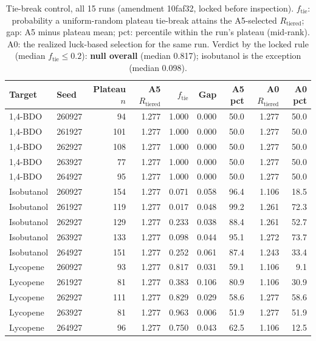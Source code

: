 \documentclass[12pt,a4paper]{article}
\begin{document}
\begin{table}[h]
\centering
\small
\caption{Tie-break control, all 15 runs (amendment 10faf32, locked before inspection). $f_{\mathrm{tie}}$: probability a uniform-random plateau tie-break attains the A5-selected $R_{\mathrm{tiered}}$; gap: A5 minus plateau mean; pct: percentile within the run's plateau (mid-rank). A0: the realized luck-based selection for the same run. Verdict by the locked rule (median $f_{\mathrm{tie}} \le 0.2$): \textbf{null overall} (median 0.817); isobutanol is the exception (median 0.098).}
\label{tab:tiebreak}
\begin{tabular}{l l r r r r r r r}
\hline
Target & Seed & Plateau $n$ & A5 $R_{\mathrm{tiered}}$ & $f_{\mathrm{tie}}$ & Gap & A5 pct & A0 $R_{\mathrm{tiered}}$ & A0 pct \\
\hline
1,4-BDO & 260927 & 94 & 1.277 & 1.000 & 0.000 & 50.0 & 1.277 & 50.0 \\
1,4-BDO & 261927 & 101 & 1.277 & 1.000 & 0.000 & 50.0 & 1.277 & 50.0 \\
1,4-BDO & 262927 & 108 & 1.277 & 1.000 & 0.000 & 50.0 & 1.277 & 50.0 \\
1,4-BDO & 263927 & 77 & 1.277 & 1.000 & 0.000 & 50.0 & 1.277 & 50.0 \\
1,4-BDO & 264927 & 95 & 1.277 & 1.000 & 0.000 & 50.0 & 1.277 & 50.0 \\
Isobutanol & 260927 & 154 & 1.277 & 0.071 & 0.058 & 96.4 & 1.106 & 18.5 \\
Isobutanol & 261927 & 119 & 1.277 & 0.017 & 0.048 & 99.2 & 1.261 & 72.3 \\
Isobutanol & 262927 & 129 & 1.277 & 0.233 & 0.038 & 88.4 & 1.261 & 52.7 \\
Isobutanol & 263927 & 133 & 1.277 & 0.098 & 0.044 & 95.1 & 1.272 & 73.7 \\
Isobutanol & 264927 & 151 & 1.277 & 0.252 & 0.061 & 87.4 & 1.243 & 33.4 \\
Lycopene & 260927 & 93 & 1.277 & 0.817 & 0.031 & 59.1 & 1.106 & 9.1 \\
Lycopene & 261927 & 81 & 1.277 & 0.383 & 0.106 & 80.9 & 1.106 & 30.9 \\
Lycopene & 262927 & 111 & 1.277 & 0.829 & 0.029 & 58.6 & 1.277 & 58.6 \\
Lycopene & 263927 & 81 & 1.277 & 0.963 & 0.006 & 51.9 & 1.277 & 51.9 \\
Lycopene & 264927 & 96 & 1.277 & 0.750 & 0.043 & 62.5 & 1.106 & 12.5 \\
\hline
\end{tabular}
\end{table}
\end{document}
